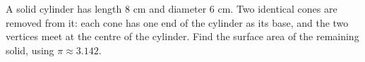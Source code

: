 A solid cylinder has length $8$ cm and diameter $6$ cm. Two identical cones are removed from it: each cone has one end of the cylinder as its base, and the two vertices meet at the centre of the cylinder. Find the surface area of the remaining solid, using $\pi\approx3.142$.
